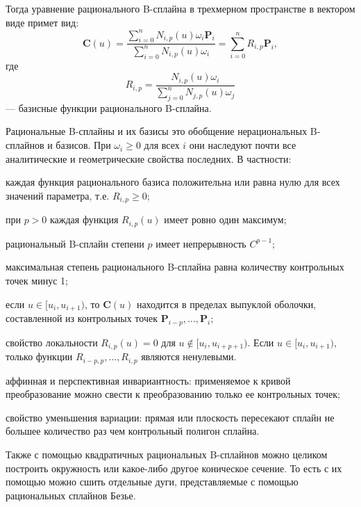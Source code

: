 \documentclass{bmstu}
\newenvironment{gost-itemize}
{\begin{itemize}[label=---,itemindent=\parindent,leftmargin=0pt]}
	{\end{itemize}}
\begin{document}
Тогда уравнение рационального B-сплайна в трехмерном пространстве в вектором виде примет вид:
\begin{equation}\label{ratcurve}
    \mathbf{C}(u) = \frac{\sum\limits_{i=0}^nN_{i,p}(u)\omega_i\mathbf{P}_i}{\sum\limits_{i=0}^nN_{i,p}(u)\omega_i}=\sum\limits_{i=0}^nR_{i,p}\mathbf{P}_i,
\end{equation}
где
\begin{equation*}
    R_{i,p} = \frac{N_{i,p}(u)\omega_i}{\sum\limits_{j=0}^nN_{j,p}(u)\omega_j}
\end{equation*}
 --- базисные функции рационального B-сплайна.

Рациональные B-сплайны и их базисы это обобщение нерациональных
B-сплайнов и базисов. При $\omega_i \ge 0$ для всех $i$ они наследуют почти все
аналитические и геометрические свойства последних. В частности:
\begin{gost-itemize}
    \item каждая функция рационального базиса положительна или равна нулю для всех значений параметра, т.е. $R_{i,p}\ge0$;
    \item при $p > 0$ каждая функция $R_{i, p}(u)$ имеет ровно один максимум;
    \item рациональный B-сплайн степени $p$ имеет непрерывность $C^{p-1}$;
    \item максимальная степень рационального B-сплайна равна количеству контрольных точек минус 1;
    \item если $u\in[u_i, u_{i+1})$, то $\mathbf{C}(u)$ находится в пределах выпуклой оболочки, составленной из контрольных точек $\mathbf{P}_{i-p},\dots,\mathbf{P}_{i}$;
    \item свойство локальности $R_{i,p}(u)=0$ для $u\notin[u_i, u_{i+p+1})$. Если $u\in[u_i, u_{i+1})$, только функции $R_{i-p, p},\dots,R_{i,p}$ являются ненулевыми.
    \item аффинная и перспективная инвариантность: применяемое к кривой
    преобразование можно свести к преобразованию только ее
    контрольных точек;
    \item свойство уменьшения вариации: прямая или плоскость пересекают
    сплайн не большее количество раз чем контрольный полигон сплайна.
\end{gost-itemize}

Также с помощью квадратичных рациональных B-сплайнов можно целиком построить окружность или какое-либо другое коническое сечение. То есть с их помощью можно сшить отдельные дуги, представляемые с помощью рациональных сплайнов Безье. 
\end{document}
